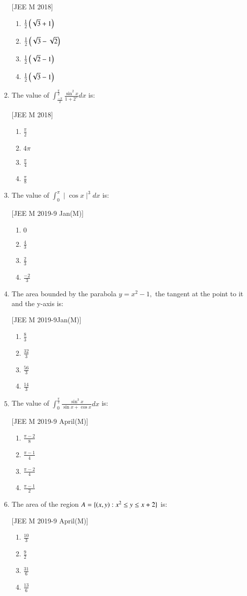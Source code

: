 \documentclass[journal,12pt,onecolumn]{IEEEtran}
\theoremstyle{remark}
\begin{document}
\begin{enumerate}
		\hfill{[JEE M 2018]}
		\begin{enumerate}
			\item $\frac{1}{2}\left(\sqrt{3}+1\right)$
			\item $\frac{1}{2}\left(\sqrt{3}-\sqrt{2}\right)$
			\item $\frac{1}{2}\left(\sqrt{2}-1\right)$
			\item $\frac{1}{2}\left(\sqrt{3}-1\right)$
		\end{enumerate}
	\item The value of $\int_{\frac{-\pi}{2}}^{\frac{\pi}{2}}\frac{\sin^{2} x}{1+2^{x}}dx$ is:

		\hfill{[JEE M 2018]}
		\begin{enumerate}
			\item $\frac{\pi}{2}$
			\item $4\pi$
			\item $\frac{\pi}{4}$
			\item $\frac{\pi}{8}$
		\end{enumerate}
	\item The value of $\int_{0}^{\pi}\mid{\cos x}\mid^{3}dx$ is:

		\hfill{[JEE M 2019-9 Jan(M)]}
		\begin{enumerate}
			\item $0$
			\item $\frac{4}{3}$
			\item $\frac{2}{3}$
			\item $\frac{-2}{3}$
		\end{enumerate}
	\item The area  bounded by the parabola $y=x^{2}-1,$ the tangent at the point  to it and the y-axis is:

		\hfill{[JEE M 2019-9Jan(M)]}
		\begin{enumerate}
			\item $\frac{8}{3}$
			\item $\frac{32}{3}$
			\item $\frac{56}{3}$
			\item $\frac{14}{3}$
		\end{enumerate}
	\item The value of $\int_{0}^{\frac{\pi}{2}}\frac{\sin^{3} x}{\sin x + \cos x}dx$ is:

		\hfill{[JEE M 2019-9 April(M)]}
		\begin{enumerate}
			\item $\frac{\pi-2}{8}$
			\item $\frac{\pi-1}{4}$
			\item $\frac{\pi-2}{4}$
			\item $\frac{\pi-1}{2}$
		\end{enumerate}
	\item The area  of the region $A=\{\left(x,y\right):x^{2}\leq y\leq x+2\}$ is:

		\hfill{[JEE M 2019-9 April(M)]}
		\begin{enumerate}
			\item $\frac{10}{3}$
			\item $\frac{9}{2}$
			\item $\frac{31}{6}$
			\item $\frac{13}{6}$
		\end{enumerate}
\end{enumerate}
\end{document}
